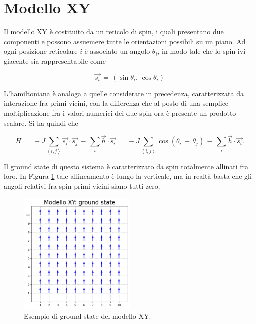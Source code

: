\section{Modello XY}

Il modello XY è costituito da un reticolo di spin, i quali presentano due componenti e possono assuemere tutte le orientazioni 
possibili su un piano. Ad ogni posizione reticolare $i$ è associato un angolo $\theta_i$, in modo tale che lo spin ivi giacente 
sia rappresentabile come 

\begin{equation}
    \vec{s_i}\,=\,\left(\sin{\theta_i},\,\cos{\theta_i}\right)
    \label{eq: spin_XY}
\end{equation}

L'hamiltoniana è analoga a quelle considerate in precedenza, caratterizzata da interazione fra primi vicini, con la differenza che 
al posto di una semplice moltiplicazione fra i valori numerici dei due spin ora è presente un prodotto scalare. Si ha quindi che 

\begin{equation}
    H\,=\,-J\sum_{\left<i,j\right>}\vec{s_i} \cdot \vec{s_j}\,-\,\sum_i \vec{h} \cdot \vec{s_i}\,=\,-J\sum_{\left<i,j\right>}\cos{\left(\theta_i\,-\,\theta_j\right)}\,-\,\sum_i \vec{h} \cdot \vec{s_i}. 
    \label{eq: ham_XY}
\end{equation}

Il ground state di questo sistema è caratterizzato da spin totalmente allinati fra loro. In Figura \ref{fig: modelloXY_gs} tale allineamento 
è lungo la verticale, ma in realtà basta che gli angoli relativi fra spin primi vicini siano tutti zero.

\begin{figure}[H]
    \centering
    \includegraphics[width=0.5\textwidth]{Immagini/modelloXY_gs.png}
    \caption{Esempio di ground state del modello XY.}
    \label{fig: modelloXY_gs}
\end{figure}





